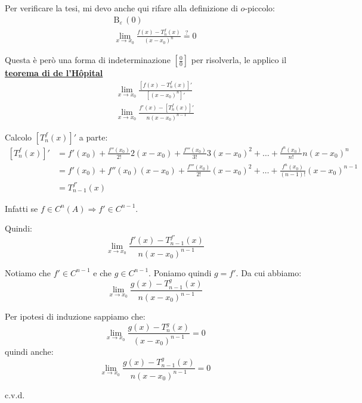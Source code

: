 \documentclass[../../dimostrazioni]{subfiles}
\begin{document}
                Per verificare la tesi, mi devo anche qui rifare alla definizione di \(o\)-piccolo:
                \begin{gather*}
                    \mathrm{B}_\varepsilon \, (0)\\
                    \lim_{x \to x_0} \frac{f(x)-T _n ^ f (x)}{(x-x_0)^n} \stackrel{?}{=} 0
                \end{gather*}

                Questa è però una forma di indeterminazione \(\left[\frac{0}{0}\right]\) per risolverla, le applico il \textbf{\hyperref[teoHopital]{teorema di de l'Hôpital}}
                \begin{gather*}
                    \lim_{x \to x_0} \frac{\left[f(x)-T _n ^ f (x)\right]'}{\left[(x-x_0)^n\right]'}\\
                    \lim_{x \to x_0} \frac{f'(x)-\left[T _n ^ f (x)\right]'}{n(x-x_0)^{n-1}}
                \end{gather*}

                Calcolo \(\left[T _n ^ f (x)\right]'\) a parte:
                \begin{align*}
                    \left[T _n ^ f (x)\right]' &= f'(x_0) + \frac{f''(x_0)}{2!}2(x-x_0) + \frac{f'''(x_0)}{3!}3(x-x_0)^2 + \dots + \frac{f^n(x_0)}{n!}n(x-x_0)^n \\
                                            &= f'(x_0) + f''(x_0)(x-x_0) + \frac{f'''(x_0)}{2!}(x-x_0)^2 + \dots + \frac{f^n(x_0)}{(n-1)!}(x-x_0)^{n-1} \\
                                            &= T_{n-1} ^{f'} (x)
                \end{align*}

                Infatti se \(f \in C^n (A) \Rightarrow f' \in C^{n-1} \).

                Quindi:
                \[  \lim_{x \to x_0} \frac{f'(x)-T_{n-1} ^{f'} (x)}{n(x-x_0)^{n-1}}    \]

                Notiamo che \(f' \in C^{n-1}\) e che \(g \in C^{n-1}\). Poniamo quindi \(g = f'\). Da cui abbiamo:
                \[  \lim_{x \to x_0} \frac{g(x)-T_{n-1} ^{g} (x)}{n(x-x_0)^{n-1}}    \]

                Per ipotesi di induzione sappiamo che:
                \[  \lim_{x \to x_0} \frac{g(x) - T _n ^ g (x)}{(x-x_0)^{n-1}} = 0 \]
                quindi anche:
                \[  \lim_{x \to x_0} \frac{g(x)-T_{n-1} ^{g} (x)}{n(x-x_0)^{n-1}}  = 0  \]

                c.v.d.
\end{document}
